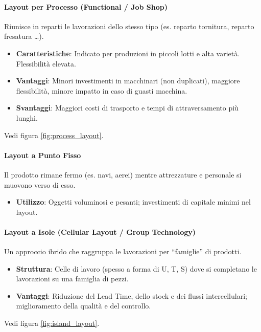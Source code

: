 %
\paragraph{Layout per Processo (Functional / Job Shop)} Riunisce in reparti le lavorazioni dello stesso tipo (es. reparto tornitura, reparto fresatura \dots).
\begin{itemize}
    \item \textbf{Caratteristiche}: Indicato per produzioni in piccoli lotti e alta varietà. Flessibilità elevata.
    \item \textbf{Vantaggi}: Minori investimenti in macchinari (non duplicati), maggiore flessibilità, minore impatto in caso di guasti macchina.
    \item \textbf{Svantaggi}: Maggiori costi di trasporto e tempi di attraversamento più lunghi.
\end{itemize}
Vedi figura \ref{fig:process_layout}.

%
\paragraph{Layout a Punto Fisso} Il prodotto rimane fermo (es. navi, aerei) mentre attrezzature e personale si muovono verso di esso.
\begin{itemize}
    \item \textbf{Utilizzo}: Oggetti voluminosi e pesanti; investimenti di capitale minimi nel layout.
\end{itemize}

%
\paragraph{Layout a Isole (Cellular Layout / Group Technology)} Un approccio ibrido che raggruppa le lavorazioni per ``famiglie'' di prodotti.
\begin{itemize}
    \item \textbf{Struttura}: Celle di lavoro (spesso a forma di U, T, S) dove si completano le lavorazioni su una famiglia di pezzi.
    \item \textbf{Vantaggi}: Riduzione del Lead Time, dello stock e dei flussi intercellulari; miglioramento della qualità e del controllo.
\end{itemize}
Vedi figura \ref{fig:island_layout}.


